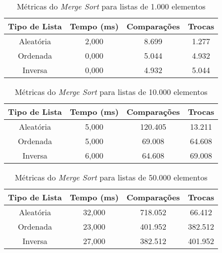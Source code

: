 \documentclass[a4paper,12pt]{article}
\begin{document}
\begin{table}[H]
\centering
\caption{Métricas do \textit{Merge Sort} para listas de 1.000 elementos}
\begin{tabular}{|c|c|c|c|}
\hline
\textbf{Tipo de Lista} & \textbf{Tempo (ms)} & \textbf{Comparações} & \textbf{Trocas} \\ \hline
Aleatória              & 2,000               & 8.699                & 1.277           \\ \hline
Ordenada               & 0,000               & 5.044                & 4.932           \\ \hline
Inversa                & 0,000               & 4.932                & 5.044           \\ \hline
\end{tabular}
\end{table}

\begin{table}[H]
\centering
\caption{Métricas do \textit{Merge Sort} para listas de 10.000 elementos}
\begin{tabular}{|c|c|c|c|}
\hline
\textbf{Tipo de Lista} & \textbf{Tempo (ms)} & \textbf{Comparações} & \textbf{Trocas} \\ \hline
Aleatória              & 5,000               & 120.405              & 13.211          \\ \hline
Ordenada               & 5,000               & 69.008               & 64.608          \\ \hline
Inversa                & 6,000               & 64.608               & 69.008          \\ \hline
\end{tabular}
\end{table}

\begin{table}[H]
\centering
\caption{Métricas do \textit{Merge Sort} para listas de 50.000 elementos}
\begin{tabular}{|c|c|c|c|}
\hline
\textbf{Tipo de Lista} & \textbf{Tempo (ms)} & \textbf{Comparações} & \textbf{Trocas} \\ \hline
Aleatória              & 32,000              & 718.052              & 66.412          \\ \hline
Ordenada               & 23,000              & 401.952              & 382.512         \\ \hline
Inversa                & 27,000              & 382.512              & 401.952         \\ \hline
\end{tabular}
\end{table}
\end{document}
